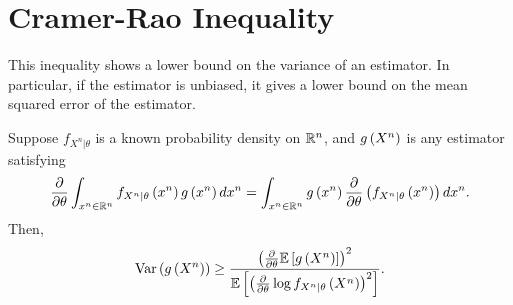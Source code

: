 \documentclass[twoside]{article}
\begin{document}



\section{Cramer-Rao Inequality}

This inequality shows a lower bound on the variance of an estimator. In
particular, if the estimator is unbiased, it gives a lower bound on the mean
squared error of the estimator.

\begin{theorem}
  \label{thm:crlb}
  Suppose \(f_{X^n|\theta}\) is a known probability density on \(\mathbb R^n\), and
  \(g\left(X^n\right)\) is any estimator satisfying
  \begin{equation}
    \frac{\partial}{\partial \theta}\int_{x^n\in\mathbb R^n}f_{X^n|\theta}\left(x^n\right)g\left(x^n\right)dx^n = 
    \int_{x^n\in\mathbb R^n}g\left(x^n\right)\frac{\partial}{\partial \theta}\left(f_{X^n|\theta}\left(x^n\right)\right)dx^n.
    \label{eq:crlb-diff}
  \end{equation}
  Then,
  \begin{equation}
    \mathrm{Var}\left(g\left(X^n\right)\right) \ge 
    \frac{\left(\frac{\partial}{\partial \theta}\mathbb{E}\left[ g\left(X^n\right) \right]\right)^2}{\mathbb{E}\left[ \left(\frac{\partial}{\partial \theta}\log{f_{X^n|\theta}\ensuremath{\left(X^n\right)}}\right)^2 \right]}.
    \label{eq:crlb-ineq}
  \end{equation}
\end{theorem}
\end{document}
